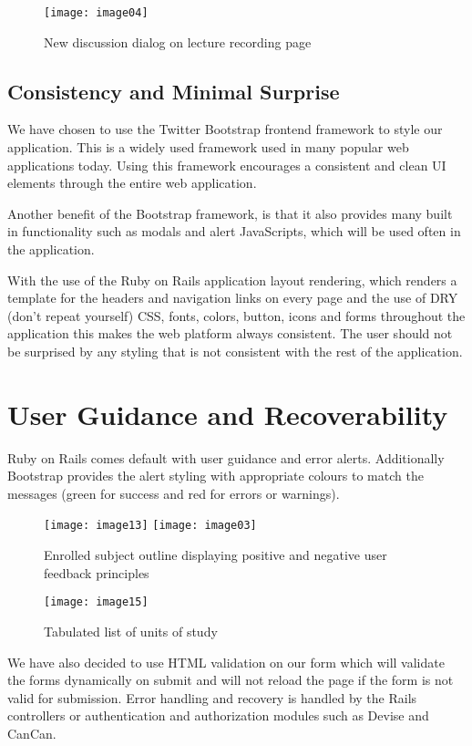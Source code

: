\documentclass{article}
\begin{document}
\begin{figure}[h!]
\centering
\texttt{[image: image04]}
\caption{New discussion dialog on lecture recording page}
\end{figure}

\subsection{Consistency and Minimal Surprise}
We have chosen to use the Twitter Bootstrap frontend framework to style our application. This is a widely used framework used in many popular web applications today. Using this framework encourages a consistent and clean UI elements through the entire web application. 

Another benefit of the Bootstrap framework, is that it also provides many built in functionality such as modals and alert JavaScripts, which will be used often in the application.

With the use of the Ruby on Rails application layout rendering, which renders a template for the headers and navigation links on every page and the use of DRY (don't repeat yourself) CSS, fonts, colors, button, icons and forms throughout the application this makes the web platform always consistent. The user should not be surprised by any styling that is not consistent with the rest of the application.

\clearpage
\section{User Guidance and Recoverability}
Ruby on Rails comes default with user guidance and error alerts. Additionally Bootstrap provides the alert styling with appropriate colours to match the messages (green for success and red for errors or warnings). 

\begin{figure}[h!]
\centering
\texttt{[image: image13]}
\texttt{[image: image03]}
\caption{Enrolled subject outline displaying positive and negative user feedback principles}
\end{figure}

\begin{figure}[h!]
\centering
\texttt{[image: image15]}
\caption{Tabulated list of units of study}
\end{figure}

\clearpage
We have also decided to use HTML validation on our form which will validate the forms dynamically on submit and will not reload the page if the form is not valid for submission. Error handling and recovery is handled by the Rails controllers or authentication and authorization modules such as Devise and CanCan.
\end{document}
